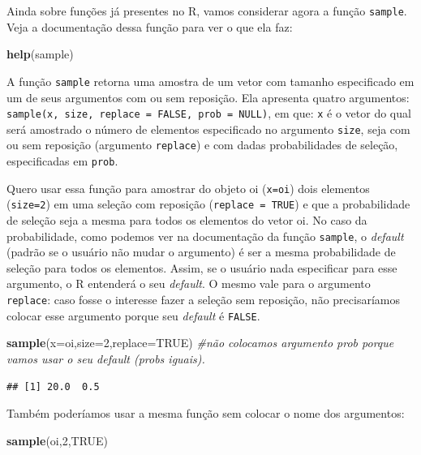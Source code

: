 \documentclass[
]{book}
\newenvironment{Shaded}{\begin{snugshade}}{\end{snugshade}}
\newcommand{\CommentTok}[1]{\textcolor[rgb]{0.56,0.35,0.01}{\textit{#1}}}
\newcommand{\DataTypeTok}[1]{\textcolor[rgb]{0.13,0.29,0.53}{#1}}
\newcommand{\DecValTok}[1]{\textcolor[rgb]{0.00,0.00,0.81}{#1}}
\newcommand{\KeywordTok}[1]{\textcolor[rgb]{0.13,0.29,0.53}{\textbf{#1}}}
\newcommand{\NormalTok}[1]{#1}
\newcommand{\OtherTok}[1]{\textcolor[rgb]{0.56,0.35,0.01}{#1}}
\begin{document}
Ainda sobre funções já presentes no R, vamos considerar agora a função \texttt{sample}. Veja a documentação dessa função para ver o que ela faz:

\begin{Shaded}
\begin{Highlighting}[]
\KeywordTok{help}\NormalTok{(sample)}
\end{Highlighting}
\end{Shaded}

A função \texttt{sample} retorna uma amostra de um vetor com tamanho especificado em um de seus argumentos com ou sem reposição. Ela apresenta quatro argumentos: \texttt{sample(x,\ size,\ replace\ =\ FALSE,\ prob\ =\ NULL)}, em que: \texttt{x} é o vetor do qual será amostrado o número de elementos especificado no argumento \texttt{size}, seja com ou sem reposição (argumento \texttt{replace}) e com dadas probabilidades de seleção, especificadas em \texttt{prob}.

Quero usar essa função para amostrar do objeto oi (\texttt{x=oi}) dois elementos (\texttt{size=2}) em uma seleção com reposição (\texttt{replace\ =\ TRUE}) e que a probabilidade de seleção seja a mesma para todos os elementos do vetor oi. No caso da probabilidade, como podemos ver na documentação da função \texttt{sample}, o \emph{default} (padrão se o usuário não mudar o argumento) é ser a mesma probabilidade de seleção para todos os elementos. Assim, se o usuário nada especificar para esse argumento, o R entenderá o seu \emph{default}. O mesmo vale para o argumento \texttt{replace}: caso fosse o interesse fazer a seleção sem reposição, não precisaríamos colocar esse argumento porque seu \emph{default} é \texttt{FALSE}.

\begin{Shaded}
\begin{Highlighting}[]
\KeywordTok{sample}\NormalTok{(}\DataTypeTok{x=}\NormalTok{oi,}\DataTypeTok{size=}\DecValTok{2}\NormalTok{,}\DataTypeTok{replace=}\OtherTok{TRUE}\NormalTok{) }\CommentTok{#não colocamos argumento prob porque vamos usar o seu default (probs iguais).}
\end{Highlighting}
\end{Shaded}

\begin{verbatim}
## [1] 20.0  0.5
\end{verbatim}

Também poderíamos usar a mesma função sem colocar o nome dos argumentos:

\begin{Shaded}
\begin{Highlighting}[]
\KeywordTok{sample}\NormalTok{(oi,}\DecValTok{2}\NormalTok{,}\OtherTok{TRUE}\NormalTok{) }
\end{Highlighting}
\end{Shaded}
\end{document}
